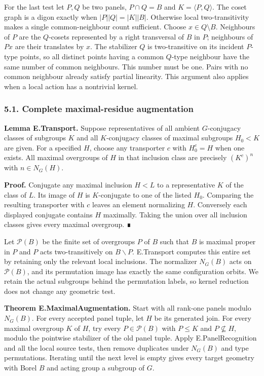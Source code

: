 \documentclass[
  11pt,
  a4paper,
]{article}
\begin{document}
For the last test let \(P,Q\) be two panels, \(P\cap Q=B\) and
\(K=\langle P,Q\rangle\). The coset graph is a digon exactly when
\(|P||Q|=|K||B|\). Otherwise local two-transitivity makes a single
common-neighbour count sufficient. Choose \(x\in Q\setminus B\).
Neighbours of \(P\) are the \(Q\)-cosets represented by a right
transversal of \(B\) in \(P\); neighbours of \(Px\) are their translates
by \(x\). The stabilizer \(Q\) is two-transitive on its incident
\(P\)-type points, so all distinct points having a common \(Q\)-type
neighbour have the same number of common neighbours. This number must be
one. Pairs with no common neighbour already satisfy partial linearity.
This argument also applies when a local action has a nontrivial kernel.

\subsubsection{5.1. Complete maximal-residue
augmentation}\label{complete-maximal-residue-augmentation}

\textbf{Lemma E.Transport.} Suppose representatives of all ambient
\(G\)-conjugacy classes of subgroups \(K\) and all \(K\)-conjugacy
classes of maximal subgroups \(H_0<K\) are given. For a specified \(H\),
choose any transporter \(c\) with \(H_0^c=H\) when one exists. All
maximal overgroups of \(H\) in that inclusion class are precisely
\((K^c)^n\) with \(n\in N_G(H)\).

\textbf{Proof.} Conjugate any maximal inclusion \(H<L\) to a
representative \(K\) of the class of \(L\). Its image of \(H\) is
\(K\)-conjugate to one of the listed \(H_0\). Comparing the resulting
transporter with \(c\) leaves an element normalizing \(H\). Conversely
each displayed conjugate contains \(H\) maximally. Taking the union over
all inclusion classes gives every maximal overgroup. ∎

Let \(\mathcal P(B)\) be the finite set of overgroups \(P\) of \(B\)
such that \(B\) is maximal proper in \(P\) and \(P\) acts
two-transitively on \(B\backslash P\). E.Transport computes this entire
set by retaining only the relevant local inclusions. The normalizer
\(N_G(B)\) acts on \(\mathcal P(B)\), and its permutation image has
exactly the same configuration orbits. We retain the actual subgroups
behind the permutation labels, so kernel reduction does not change any
geometric test.

\textbf{Theorem E.MaximalAugmentation.} Start with all rank-one panels
modulo \(N_G(B)\). For every accepted panel tuple, let \(H\) be its
generated join. For every maximal overgroup \(K\) of \(H\), try every
\(P\in\mathcal P(B)\) with \(P\le K\) and \(P\nsubseteq H\), modulo the
pointwise stabilizer of the old panel tuple. Apply E.PanelRecognition
and all the local source tests, then remove duplicates under \(N_G(B)\)
and type permutations. Iterating until the next level is empty gives
every target geometry with Borel \(B\) and acting group a subgroup of
\(G\).
\end{document}
